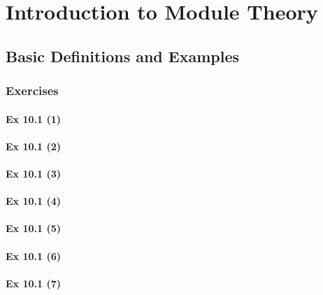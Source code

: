 \setcounter{chapter}{0}
\renewcommand{\thechapter}{10}
\chapter{Introduction to Module Theory}\label{ch:10}
\setcounter{equation}{0}	        %

\section{Basic Definitions and  Examples}\label{sec:10.1}	
\subsection*{Exercises}\label{sec:10.1_Exercises}

\subsubsection{Ex 10.1 (1)}\label{sec:Ex_10.1.1}

\subsubsection{Ex 10.1 (2)}\label{sec:Ex_10.1.2}

\subsubsection{Ex 10.1 (3)}\label{sec:Ex_10.1.3}

\subsubsection{Ex 10.1 (4)}\label{sec:Ex_10.1.4}

\subsubsection{Ex 10.1 (5)}\label{sec:Ex_10.1.5}

\subsubsection{Ex 10.1 (6)}\label{sec:Ex_10.1.6}

\subsubsection{Ex 10.1 (7)}\label{sec:Ex_10.1.7}

